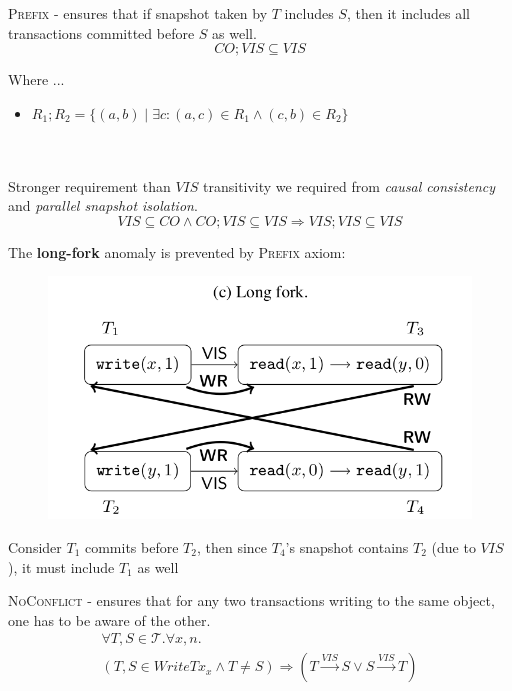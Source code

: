 \documentclass{beamer}
\begin{document}
\begin{frame}
	\begin{definition}[Prefix]
		\textsc{Prefix} - ensures that if snapshot taken by $T$ includes $S$, then it includes all transactions committed before $S$ as well.
		$$ CO; VIS \subseteq VIS $$
	\end{definition}
	Where ...
	\begin{itemize}
		\item $R_1;R_2 = \{(a,b) \mid \exists c: (a,c) \in R_1 \wedge (c,b) \in R_2\} $
	\end{itemize}
	\hfill \\
	\hfill \\
	Stronger requirement than $VIS$ transitivity we required from \textit{causal consistency} and \textit{parallel snapshot isolation}.
	$$
		VIS \subseteq CO \wedge CO;VIS \subseteq VIS \Rightarrow VIS;VIS \subseteq VIS
	$$
\end{frame}

\begin{frame}
	The \textbf{long-fork} anomaly is prevented by \textsc{Prefix} axiom:
	\begin{figure}
		\includegraphics[scale=0.3]{fig2c}
	\end{figure}
	\begin{example}
		Consider $T_1$ commits before $T_2$, then since $T_4$'s snapshot contains $T_2$ (due to $VIS$), it must include $T_1$ as well
	\end{example}
\end{frame}

\begin{frame}
	\begin{definition}
		\textsc{NoConflict} - ensures that for any two transactions writing to the same object, one has to be aware of the other.
		\begin{multline*}
		\forall T,S \in \mathcal{T}. \forall x,n . \\
		\left( T,S \in WriteTx_x \wedge T \ne S \right)
		\Rightarrow
		\left( T \xrightarrow{VIS} S \vee S \xrightarrow{VIS} T \right)
		\end{multline*}
	\end{definition}
\end{frame}
\end{document}
